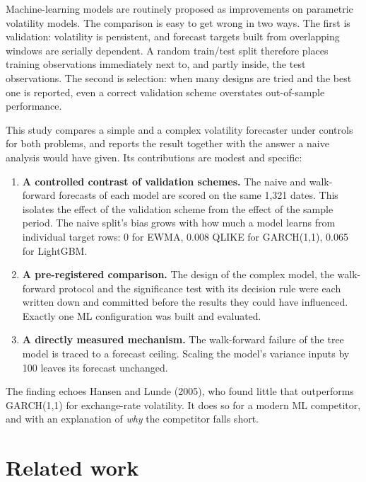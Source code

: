 \documentclass[11pt]{article}
\providecommand{\tightlist}{\setlength{\itemsep}{0pt}\setlength{\parskip}{0pt}}
\begin{document}
Machine-learning models are routinely proposed as improvements on
parametric volatility models. The comparison is easy to get wrong in two
ways. The first is validation: volatility is persistent, and forecast
targets built from overlapping windows are serially dependent. A random
train/test split therefore places training observations immediately next
to, and partly inside, the test observations. The second is selection:
when many designs are tried and the best one is reported, even a correct
validation scheme overstates out-of-sample performance.

This study compares a simple and a complex volatility forecaster under
controls for both problems, and reports the result together with the
answer a naive analysis would have given. Its contributions are modest and
specific:

\begin{enumerate}
\def\labelenumi{\arabic{enumi}.}
\tightlist
\item
  \textbf{A controlled contrast of validation schemes.} The naive and
  walk-forward forecasts of each model are scored on the same 1,321
  dates. This isolates the effect of the validation scheme from the
  effect of the sample period. The naive split's bias grows with how much
  a model learns from individual target rows: 0 for EWMA, 0.008 QLIKE for
  GARCH(1,1), 0.065 for LightGBM.
\item
  \textbf{A pre-registered comparison.} The design of the complex model, the
  walk-forward protocol and the significance test with its decision rule
  were each written down and committed before the results they could have
  influenced. Exactly one ML configuration was built and evaluated.
\item
  \textbf{A directly measured mechanism.} The walk-forward failure of the tree
  model is traced to a forecast ceiling. Scaling the model's variance
  inputs by 100 leaves its forecast unchanged.
\end{enumerate}

The finding echoes Hansen and Lunde (2005), who found little that
outperforms GARCH(1,1) for exchange-rate volatility. It does so for a
modern ML competitor, and with an explanation of \emph{why} the competitor falls
short.

\hypertarget{related-work}{%
\section{Related work}\label{related-work}}
\end{document}
